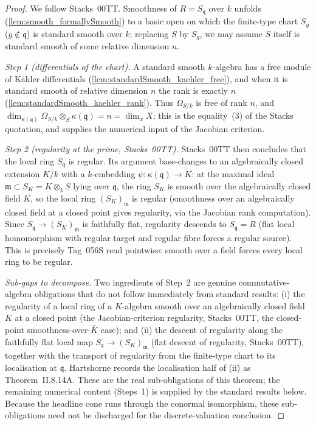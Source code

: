 \begin{proof}
  We follow Stacks~00TT. Smoothness of \(R = S_{\mathfrak q}\) over \(k\)
  unfolds (\cref{lem:smooth_formallySmooth}) to a basic open on which the
  finite-type chart \(S_g\) (\(g \notin \mathfrak q\)) is standard smooth over
  \(k\); replacing \(S\) by \(S_g\), we may assume \(S\) itself is standard
  smooth of some relative dimension \(n\).

  \emph{Step 1 (differentials of the chart).} A standard smooth \(k\)-algebra
  has a free module of K\"ahler differentials
  (\cref{lem:standardSmooth_kaehler_free}), and when it is standard smooth of
  relative dimension \(n\) the rank is exactly \(n\)
  (\cref{lem:standardSmooth_kaehler_rank}). Thus \(\Omega_{S/k}\) is free of
  rank \(n\), and \(\dim_{\kappa(\mathfrak q)} \Omega_{S/k} \otimes_S
  \kappa(\mathfrak q) = n = \dim_x X\); this is the equality~(3) of the Stacks
  quotation, and supplies the numerical input of the Jacobian criterion.

  \emph{Step 2 (regularity at the prime, Stacks~00TT).} Stacks~00TT then
  concludes that the local ring \(S_{\mathfrak q}\) is regular. Its argument
  base-changes to an algebraically closed extension \(K / k\) with a
  \(k\)-embedding \(\psi : \kappa(\mathfrak q) \to K\): at the maximal ideal
  \(\mathfrak m \subset S_K = K \otimes_k S\) lying over \(\mathfrak q\), the
  ring \(S_K\) is smooth over the algebraically closed field \(K\), so the
  local ring \((S_K)_{\mathfrak m}\) is regular (smoothness over an
  algebraically closed field at a closed point gives regularity, via the
  Jacobian rank computation). Since \(S_{\mathfrak q} \to (S_K)_{\mathfrak m}\)
  is faithfully flat, regularity descends to \(S_{\mathfrak q} = R\) (flat
  local homomorphism with regular target and regular fibre forces a regular
  source). This is precisely Tag~056S read pointwise: smooth over a field
  forces every local ring to be regular.

  \emph{Sub-gaps to decompose.} Two ingredients of Step~2 are genuine
  commutative-algebra obligations that do not follow immediately from standard
  results: (i) the
  regularity of a local ring of a $K$-algebra smooth over an algebraically
  closed field $K$ at a closed point (the Jacobian-criterion regularity,
  Stacks~00TT, the closed-point smoothness-over-$\bar K$ case); and (ii) the descent of
  regularity along the faithfully flat local map $S_{\mathfrak q} \to
  (S_K)_{\mathfrak m}$ (flat descent of regularity, Stacks~00TT), together with the
  transport of regularity from the finite-type chart to its localisation at
  $\mathfrak q$. Hartshorne records the localisation half of (ii) as
  Theorem~II.8.14A. These are the real sub-obligations of this theorem; the
  remaining numerical content (Steps~1) is supplied by the standard results
  below. Because the headline cone runs through the conormal isomorphism,
  these sub-obligations need not be discharged for the discrete-valuation
  conclusion.
\end{proof}

